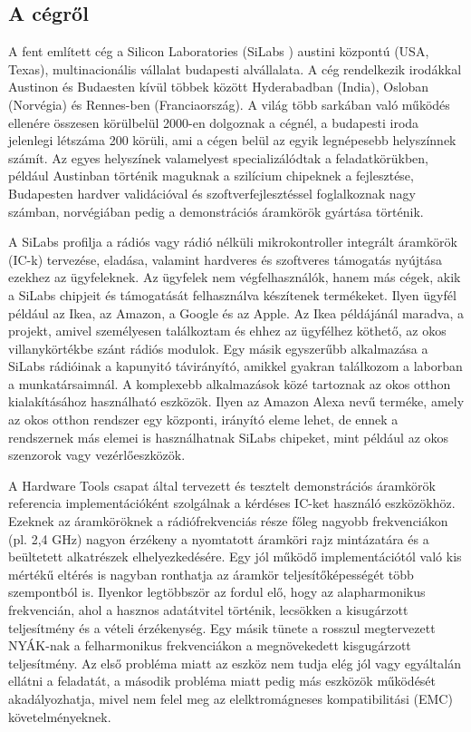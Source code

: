     \subsection{A cégről}
        A fent említett cég a Silicon Laboratories (SiLabs \cite{SiLabs}) austini központú (USA, Texas), multinacionális vállalat budapesti alvállalata. A cég rendelkezik irodákkal Austinon és Budaesten kívül többek között Hyderabadban (India), Osloban (Norvégia) és Rennes-ben (Franciaország). A világ több sarkában való működés ellenére összesen körülbelül 2000-en dolgoznak a cégnél, a budapesti iroda jelenlegi létszáma 200 körüli, ami a cégen belül az egyik legnépesebb helyszínnek számít. Az egyes helyszínek valamelyest specializálódtak a feladatkörükben, például Austinban történik maguknak a szilícium chipeknek a fejlesztése, Budapesten hardver validációval és szoftverfejlesztéssel foglalkoznak nagy számban, norvégiában pedig a demonstrációs áramkörök gyártása történik.
        \par
        A SiLabs profilja a rádiós vagy rádió nélküli mikrokontroller integrált áramkörök (IC-k) tervezése, eladása, valamint hardveres és szoftveres támogatás nyújtása ezekhez az ügyfeleknek. Az ügyfelek nem végfelhasználók, hanem más cégek, akik a SiLabs chipjeit és támogatását felhasználva készítenek termékeket. Ilyen ügyfél például az Ikea, az Amazon, a Google és az Apple. Az Ikea példájánál maradva, a projekt, amivel személyesen találkoztam és ehhez az ügyfélhez köthető, az okos villanykörtékbe szánt rádiós modulok. Egy másik egyszerűbb alkalmazása a SiLabs rádióinak a kapunyitó távirányító, amikkel gyakran találkozom a laborban a munkatársaimnál. A komplexebb alkalmazások közé tartoznak az okos otthon kialakításához használható eszközök. Ilyen az Amazon Alexa nevű terméke, amely az okos otthon rendszer egy központi, irányító eleme lehet, de ennek a rendszernek más elemei is használhatnak SiLabs chipeket, mint például az okos szenzorok vagy vezérlőeszközök.
        \par
        A Hardware Tools csapat által tervezett és tesztelt demonstrációs áramkörök referencia implementációként szolgálnak a kérdéses IC-ket használó eszközökhöz. Ezeknek az áramköröknek a rádiófrekvenciás része főleg nagyobb frekvenciákon (pl. 2,4 GHz) nagyon érzékeny a nyomtatott áramköri rajz mintázatára és a beültetett alkatrészek elhelyezkedésére. Egy jól működő implementációtól való kis mértékű eltérés is nagyban ronthatja az áramkör teljesítőképességét több szempontból is. Ilyenkor legtöbbször az fordul elő, hogy az alapharmonikus frekvencián, ahol a hasznos adatátvitel történik, lecsökken a kisugárzott teljesítmény és a vételi érzékenység. Egy másik tünete a rosszul megtervezett NYÁK-nak a felharmonikus frekvenciákon a megnövekedett kisgugárzott teljesítmény. Az első probléma miatt az eszköz nem tudja elég jól vagy egyáltalán ellátni a feladatát, a második probléma miatt pedig más eszközök működését akadályozhatja, mivel nem felel meg az elelktromágneses kompatibilitási (EMC) követelményeknek.
